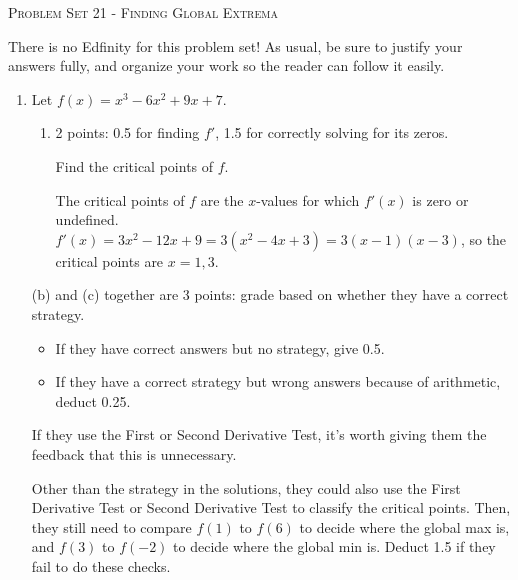 \documentclass{article}
\begin{document}
\begin{center}
  \large\textsc{Problem Set 21 - Finding Global Extrema}
\end{center}

There is no Edfinity for this problem set! As usual, be sure to justify your answers fully, and organize your work so the reader can follow it easily. 

\begin{enumerate}
\item Let $f(x) = x^3 - 6x^2 + 9x + 7$.

  \begin{enumerate}

  \item

    \begin{grading}
      2 points: 0.5 for finding $f'$, 1.5 for correctly solving for its zeros. 
    \end{grading}

    \begin{problem}[\vfill]
      Find the critical points of $f$. 
    \end{problem}

    \begin{solution}  %
      The critical points of $f$ are the $x$-values for which $f'(x)$ is
      zero or undefined.
      $f'(x) = 3x^2 - 12x + 9 = 3(x^2 - 4x + 3) = 3(x - 1)(x - 3)$, so the critical points are $\boxed{x = 1, 3}$. 
    \end{solution}

  \end{enumerate}

  \begin{grading}
    (b) and (c) together are 3 points: grade based on whether they have a correct strategy.
    \begin{itemize}[nosep]
    \item If they have correct answers but no strategy, give 0.5. 
    \item If they have a correct strategy but wrong answers because of arithmetic, deduct 0.25. 
    \end{itemize}
    If they use the First or Second Derivative Test, it's worth giving them the feedback that this is unnecessary.

    Other than the strategy in the solutions, they could also use the First Derivative Test or Second Derivative Test to classify the critical points. Then, they still need to compare $f(1)$ to $f(6)$ to decide where the global max is, and $f(3)$ to $f(-2)$ to decide where the global min is. Deduct 1.5 if they fail to do these checks. 
  \end{grading}


\end{enumerate}
\end{document}
